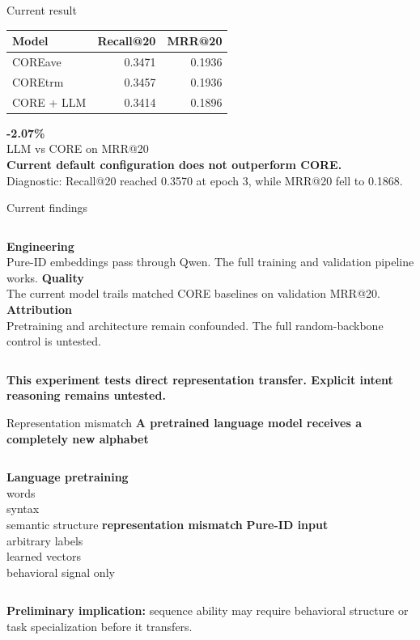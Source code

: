 \documentclass[aspectratio=169,10pt]{beamer}
\newcommand{\status}[1]{\textcolor{accentdark}{\textbf{#1}}}
\begin{document}
\begin{frame}{Current result}
\centering
\begin{tabular}{lrr}\toprule Model & Recall@20 & MRR@20\\\midrule
COREave & 0.3471 & 0.1936\\
COREtrm & 0.3457 & 0.1936\\
CORE + LLM & 0.3414 & 0.1896\\\bottomrule
\end{tabular}
\vspace{1.1em}
{\Huge\textcolor{accentdark}{\textbf{-2.07\%}}}\\
LLM vs CORE on MRR@20\\[0.8em]
\textbf{Current default configuration does not outperform CORE.}\\[0.8em]
\small Diagnostic: Recall@20 reached 0.3570 at epoch 3, while MRR@20 fell to 0.1868.
\end{frame}

\begin{frame}{Current findings}
\begin{columns}[T]
\textcolor{accentdark}{\Large\textbf{Engineering}}\\Pure-ID embeddings pass through Qwen. The full training and validation pipeline works.
\textcolor{accentdark}{\Large\textbf{Quality}}\\The current model trails matched CORE baselines on validation MRR@20.
\textcolor{accentdark}{\Large\textbf{Attribution}}\\Pretraining and architecture remain confounded. The full random-backbone control is untested.
\end{columns}
\vfill\status{This experiment tests direct representation transfer. Explicit intent reasoning remains untested.}
\end{frame}

\begin{frame}{Representation mismatch}
\centering\Large\textbf{A pretrained language model receives a completely new alphabet}
\vspace{1em}
\begin{columns}
\centering\textbf{Language pretraining}\\words\\syntax\\semantic structure
\centering\status{representation mismatch}
\centering\textbf{Pure-ID input}\\arbitrary labels\\learned vectors\\behavioral signal only
\end{columns}
\vfill\textbf{Preliminary implication:} sequence ability may require behavioral structure or task specialization before it transfers.
\end{frame}
\end{document}
